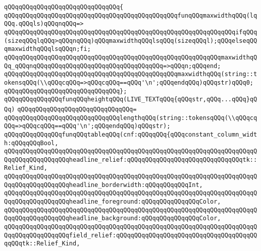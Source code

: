 \verb|qQQqqQQqqQQqqQQqqQQqqQQqqQQqqQQq{|\newline
\verb|qQQqqQQqqQQqqQQqqQQqqQQqqQQqqQQqqQQqqQQqqQQqqQQqfunqQQqmaxwidthqQQq(lqQQq.qQQqls)qQQqnqQQq=>|\newline
\verb|qQQqqQQqqQQqqQQqqQQqqQQqqQQqqQQqqQQqqQQqqQQqqQQqqQQqqQQqqQQqqQQqifqQQq(sizeqQQqlqQQq>qQQqnqQQq)qQQqmaxwidthqQQqlsqQQq(sizeqQQql);qQQqelseqQQqmaxwidthqQQqlsqQQqn;fi;|\newline
\verb|qQQqqQQqqQQqqQQqqQQqqQQqqQQqqQQqqQQqqQQqqQQqqQQqqQQqqQQqqQQqmaxwidthqQQq_qQQqnqQQqqQQqqQQqqQQqqQQqqQQqqQQqqQQqqQQq=>qQQqn;qQQqend;|\newline
\newline
\verb|qQQqqQQqqQQqqQQqqQQqqQQqqQQqqQQqqQQqqQQqqQQqqQQqmaxwidthqQQq(string::tokensqQQq(\\qQQqcqQQq=>qQQqcqQQq==qQQq'\n';qQQqendqQQq)qQQqstr)qQQq0;|\newline
\verb|qQQqqQQqqQQqqQQqqQQqqQQqqQQqqQQq};|\newline
\newline
\verb|qQQqqQQqqQQqqQQqfunqQQqheightqQQq(LIVE_TEXTqQQq{qQQqstr,qQQq...qQQq}qQQq)|\newline
\verb|qQQqqQQqqQQqqQQqqQQqqQQqqQQqqQQq=|\newline
\verb|qQQqqQQqqQQqqQQqqQQqqQQqqQQqqQQqlengthqQQq(string::tokensqQQq(\\qQQqcqQQq=>qQQqcqQQq==qQQq'\n';qQQqendqQQq)qQQqstr);|\newline
\newline
\verb|qQQqqQQqqQQqqQQqfunqQQqtableqQQq(cnf:qQQqqQQq{qQQqconstant_column_width:qQQqqQQqBool,|\newline
\verb|qQQqqQQqqQQqqQQqqQQqqQQqqQQqqQQqqQQqqQQqqQQqqQQqqQQqqQQqqQQqqQQqqQQqqQQqqQQqqQQqqQQqqQQqheadline_relief:qQQqqQQqqQQqqQQqqQQqqQQqqQQqqQQqtk::Relief_Kind,|\newline
\verb|qQQqqQQqqQQqqQQqqQQqqQQqqQQqqQQqqQQqqQQqqQQqqQQqqQQqqQQqqQQqqQQqqQQqqQQqqQQqqQQqqQQqqQQqheadline_borderwidth:qQQqqQQqqQQqInt,|\newline
\verb|qQQqqQQqqQQqqQQqqQQqqQQqqQQqqQQqqQQqqQQqqQQqqQQqqQQqqQQqqQQqqQQqqQQqqQQqqQQqqQQqqQQqqQQqheadline_foreground:qQQqqQQqqQQqqQQqColor,|\newline
\verb|qQQqqQQqqQQqqQQqqQQqqQQqqQQqqQQqqQQqqQQqqQQqqQQqqQQqqQQqqQQqqQQqqQQqqQQqqQQqqQQqqQQqqQQqheadline_background:qQQqqQQqqQQqqQQqColor,|\newline
\verb|qQQqqQQqqQQqqQQqqQQqqQQqqQQqqQQqqQQqqQQqqQQqqQQqqQQqqQQqqQQqqQQqqQQqqQQqqQQqqQQqqQQqqQQqfield_relief:qQQqqQQqqQQqqQQqqQQqqQQqqQQqqQQqqQQqqQQqqQQqtk::Relief_Kind,|\newline
